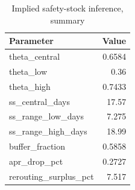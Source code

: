 \begin{table}
\caption{Implied safety-stock inference, summary}
\label{tab:table6_safety_stock_summary}
\begin{tabular}{lr}
\toprule
Parameter & Value \\
\midrule
theta\_central & 0.6584 \\
theta\_low & 0.36 \\
theta\_high & 0.7433 \\
ss\_central\_days & 17.57 \\
ss\_range\_low\_days & 7.275 \\
ss\_range\_high\_days & 18.99 \\
buffer\_fraction & 0.5858 \\
apr\_drop\_pct & 0.2727 \\
rerouting\_surplus\_pct & 7.517 \\
\bottomrule
\end{tabular}
\end{table}
